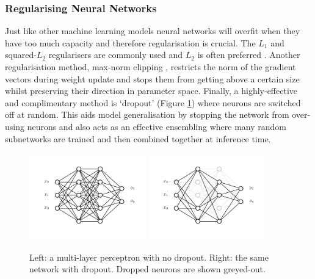 \subsubsection{Regularising Neural Networks}
Just like other machine learning models neural networks will overfit when they have too much capacity and therefore regularisation is crucial. The $L_{1}$ and squared-$L_{2}$ regularisers are commonly used and $L_{2}$ is often preferred \cite{CS231n}. Another regularisation method, max-norm clipping \cite{CS231n}, restricts the norm of the gradient vectors during weight update and stops them from getting above a certain size whilst preserving their direction in parameter space. Finally, a highly-effective and complimentary method is `dropout' \cite{Dropout} (Figure \ref{fig:machine_learning:dropout})  where neurons are switched off at random. This aids model generalisation by stopping the network from over-using neurons and also acts as an effective ensembling where many random subnetworks are trained and then combined together at inference time.  
\begin{figure}[h!]
    \begin{center}
        \includegraphics[width=0.45\textwidth]{figures/machine_learning/no_dropout.pdf}
        \includegraphics[width=0.45\textwidth]{figures/machine_learning/dropout.pdf}
    \end{center}
    \caption{Left: a multi-layer perceptron with no dropout. Right: the same network with dropout. Dropped neurons are shown greyed-out.}
        \label{fig:machine_learning:dropout}
\end{figure}

